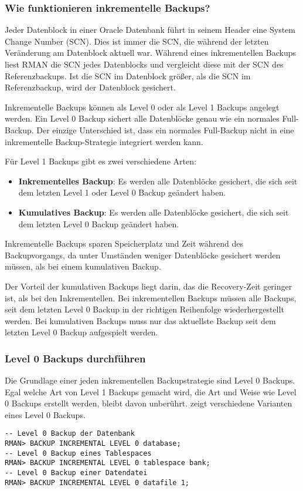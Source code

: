         \subsubsection{Wie funktionieren inkrementelle Backups?}
          Jeder Datenblock in einer Oracle Datenbank f\"uhrt in seinem Header eine System Change Number (SCN). Dies ist immer die SCN, die w\"ahrend der letzten Ver\"anderung am Datenblock aktuell war. W\"ahrend eines inkrementellen Backups liest RMAN die SCN jedes Datenblocks und vergleicht diese mit der SCN des Referenzbackups. Ist die SCN im Datenblock gr\"o\ss{}er, als die SCN im Referenzbackup, wird der Datenblock gesichert.

          Inkrementelle Backups k\"onnen als Level 0 oder als Level 1 Backups angelegt werden. Ein Level 0 Backup sichert alle Datenbl\"ocke genau wie ein normales Full-Backup. Der einzige Unterschied ist, dass ein normales Full-Backup nicht in eine inkrementelle Backup-Strategie integriert werden kann.

          F\"ur Level 1 Backups gibt es zwei verschiedene Arten:
          \begin{itemize}
            \item \textbf{Inkrementelles Backup}: Es werden alle Datenbl\"ocke gesichert, die sich seit dem letzten Level 1 oder Level 0 Backup ge\"andert haben.
            \item \textbf{Kumulatives Backup}: Es werden alle Datenbl\"ocke gesichert, die sich seit dem letzten Level 0 Backup ge\"andert haben.
          \end{itemize}
           Inkrementelle Backups sparen Speicherplatz und Zeit w\"ahrend des Backupvorgangs, da unter Umst\"anden weniger Datenbl\"ocke gesichert werden m\"ussen, als bei einem kumulativen Backup.

          Der Vorteil der kumulativen Backups liegt darin, das die Recovery-Zeit geringer ist, als bei den Inkrementellen. Bei inkrementellen Backups m\"ussen alle Backups, seit dem letzten Level 0 Backup in der richtigen Reihenfolge wiederhergestellt werden. Bei kumulativen Backups muss nur das aktuellste Backup seit dem letzten Level 0 Backup aufgespielt werden.
        \subsubsection{Level 0 Backups durchf\"uhren}
          Die Grundlage einer jeden inkrementellen Backupstrategie sind Level 0 Backups. Egal welche Art von Level 1 Backups gemacht wird, die Art und Weise wie Level 0 Backups erstellt werden, bleibt davon unber\"uhrt.  zeigt verschiedene Varianten eines Level 0 Backups.
          \begin{lstlisting}[caption={Inkrementelles Level 0 Backup},label=admin1313,language=rman]
-- Level 0 Backup der Datenbank
RMAN> BACKUP INCREMENTAL LEVEL 0 database;
-- Level 0 Backup eines Tablespaces
RMAN> BACKUP INCREMENTAL LEVEL 0 tablespace bank;
-- Level 0 Backup einer Datendatei
RMAN> BACKUP INCREMENTAL LEVEL 0 datafile 1;
          \end{lstlisting}
